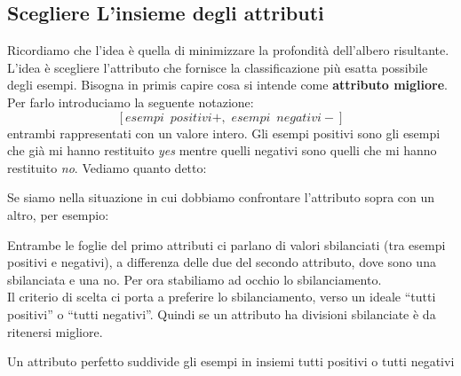 \subsection{Scegliere L'insieme degli attributi}
Ricordiamo che l'idea è quella di minimizzare la profondità dell'albero risultante. L'idea è scegliere l'attributo che fornisce la classificazione più esatta possibile degli esempi.
Bisogna in primis capire cosa si intende come \textbf{attributo migliore}. Per
farlo introduciamo la seguente notazione:
\[[esempi\,\,\,positivi+,\,\,esempi\,\,\,negativi-]\]
entrambi rappresentati con un valore intero. Gli esempi positivi sono gli esempi
che già mi hanno restituito \textit{yes} mentre quelli negativi sono quelli che mi hanno restituito \textit{no}.
Vediamo quanto detto:
\begin{figure}[H]
  \centering
\end{figure}

Se siamo nella situazione in cui dobbiamo confrontare l'attributo sopra con un
altro, per esempio:
\begin{figure}[H]
  \centering
\end{figure}
Entrambe le foglie del primo attributi ci parlano di valori sbilanciati (tra
esempi positivi e negativi), a differenza delle due del secondo attributo, dove
sono una sbilanciata e una no. Per ora stabiliamo ad occhio lo sbilanciamento.\\
Il criterio di scelta ci porta a preferire lo sbilanciamento, verso un ideale
``tutti positivi'' o ``tutti negativi''. Quindi se un attributo ha divisioni
sbilanciate è da ritenersi migliore.\\ 
\begin{definizione}
  Un attributo perfetto suddivide gli esempi in insiemi tutti positivi o tutti negativi
\end{definizione}

